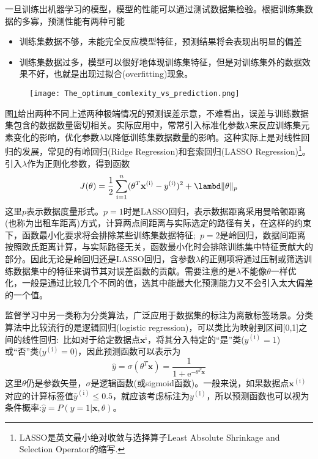 一旦训练出机器学习的模型，模型的性能可以通过测试数据集检验。根据训练集数据的多寡，预测性能有两种可能
\begin{itemize}
	\item 训练集数据不够，未能完全反应模型特征，预测结果将会表现出明显的偏差
	\item 训练集数据过多，模型可以很好地体现训练集特征，但是对训练集外的数据效果不好，也就是出现过拟合\textrm{(overfitting)}现象。
\end{itemize}
\begin{figure}[h!]
\centering
\vspace*{-0.1in}
\texttt{[image: The\_optimum\_comlexity\_vs\_prediction.png]}
\caption{\fontsize{7.2pt}{4.2pt}}%
\label{ML_Fitting_Error}
\end{figure}
图\ref{ML_Fitting_Error}给出两种不同上述两种极端情况的预测误差示意，不难看出，误差与训练数据集包含的数据数量密切相关。实际应用中，常常引入标准化参数$\lambda$来反应训练集元素变化的影响，优化参数$\lambda$以降低训练集数据数量的影响。这种实际上是对线性回归的发展，常见的有岭回归\textrm{(Ridge Regression)}和套索回归\textrm{(LASSO Regression)}\footnote{\textrm{LASSO}是英文最小绝对收敛与选择算子\textrm{Least Absolute Shrinkage and Selection Operator}的缩写.}。引入$\lambda$作为正则化参数，得到函数
\begin{equation}
	J(\theta)=\dfrac12\sum_{i=1}^n(\theta^T\mathbf{x}^{(\mathrm{i})}-y^{(\mathrm{i})})^2+\lambd\|\theta\|_p
	\label{eq:Ridge_LASSO}
\end{equation}
这里$p$表示数据度量形式。$p=1$时是\textrm{LASSO}回归，表示数据距离采用曼哈顿距离(也称为出租车距离)方式，计算两点间距离与实际选定的路径有关，在这样的约束下，函数最小化要求将会排除某些训练集数据特征;~$p=2$是岭回归，数据间距离按照欧氏距离计算，与实际路径无关，函数最小化时会排除训练集中特征贡献大的部分。因此无论是岭回归还是\textrm{LASSO}回归，含参数$\lambda$的正则项将通过压制或筛选训练数据集中的特征来调节其对误差函数的贡献。需要注意的是$\lambda$不能像$\theta$一样优化，一般是通过比较几个不同的值，选其中能最大化预测能力又不会引入太大偏差的一个值。

监督学习中另一类称为分类算法，广泛应用于数据集的标注为离散标签场景。分类算法中比较流行的是逻辑回归\textrm{(logistic regression)}，可以类比为映射到区间[0,1]之间的线性回归:~比如对于给定数据点$\mathbf{x}^{\mathrm{i}}$，将其分入特定的“是”类($y^{\mathrm{(i)}}=1$)或“否”类($y^{\mathrm{(i)}}=0$)，因此预测函数可以表示为
\begin{equation}
	\hat y=\sigma(\theta^T\mathbf{x})=\dfrac1{1+\mathrm{e}^{-\theta^T\mathbf{x}}}
	\label{eq:logstical_y}
\end{equation}
这里$\theta$仍是参数矢量，$\sigma$是逻辑函数(或\textrm{sigmoid}函数)。一般来说，如果数据点$\mathbf{x}^{(\mathrm{i})}$对应的计算标签值$\hat{y}^{(\mathrm{i})}\leqslant0.5$，就应该考虑标注为$y^{(\mathrm{i})}$，所以预测函数也可以视为条件概率:$\hat{y}=P(y=1|\mathbf{x},\theta)$。

